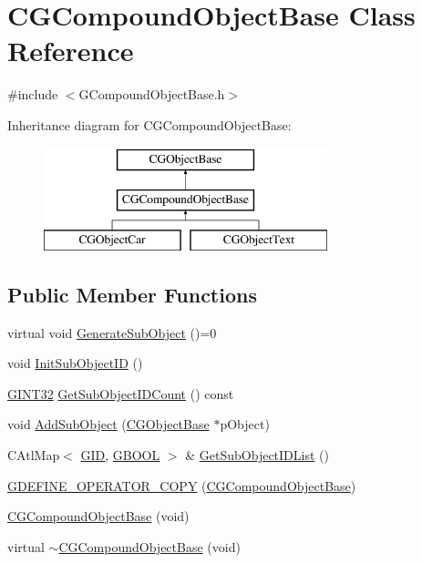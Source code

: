 \hypertarget{class_c_g_compound_object_base}{}\section{C\+G\+Compound\+Object\+Base Class Reference}
\label{class_c_g_compound_object_base}


{\ttfamily \#include $<$G\+Compound\+Object\+Base.\+h$>$}

Inheritance diagram for C\+G\+Compound\+Object\+Base\+:\begin{figure}[H]
\begin{center}
\leavevmode
\includegraphics[height=3.000000cm]{class_c_g_compound_object_base}
\end{center}
\end{figure}
\subsection*{Public Member Functions}
\begin{DoxyCompactItemize}
\item 
virtual void \hyperlink{class_c_g_compound_object_base_a1edbee3ff93a6bd05e1233c58898754e}{Generate\+Sub\+Object} ()=0
\item 
void \hyperlink{class_c_g_compound_object_base_a120a1ad5f33efda9c18bbca418285d24}{Init\+Sub\+Object\+I\+D} ()
\item 
\hyperlink{_g_types_8h_a40d8bc7c06b9e72906852691a4bf888e}{G\+I\+N\+T32} \hyperlink{class_c_g_compound_object_base_a3cebb709c979c48297c1c318968d7bb4}{Get\+Sub\+Object\+I\+D\+Count} () const 
\item 
void \hyperlink{class_c_g_compound_object_base_a72b2ef55ba1b6d2aa85a37c3ef225e4b}{Add\+Sub\+Object} (\hyperlink{class_c_g_object_base}{C\+G\+Object\+Base} $\ast$p\+Object)
\item 
C\+Atl\+Map$<$ \hyperlink{_g_types_8h_a5b96ecb16d8e437977d12cd40aa6f6d8}{G\+I\+D}, \hyperlink{_g_types_8h_a2901915743626352a6820c5405f556dc}{G\+B\+O\+O\+L} $>$ \& \hyperlink{class_c_g_compound_object_base_a375d8ea5ab9f34f62f3093f7e428fd26}{Get\+Sub\+Object\+I\+D\+List} ()
\item 
\hyperlink{class_c_g_compound_object_base_aa0196b7e44772dcde6a58db8268c9317}{G\+D\+E\+F\+I\+N\+E\+\_\+\+O\+P\+E\+R\+A\+T\+O\+R\+\_\+\+C\+O\+P\+Y} (\hyperlink{class_c_g_compound_object_base}{C\+G\+Compound\+Object\+Base})
\item 
\hyperlink{class_c_g_compound_object_base_a7f674fc0fc64f4923ea6781041eb13e0}{C\+G\+Compound\+Object\+Base} (void)
\item 
virtual \hyperlink{class_c_g_compound_object_base_a34c806011a7f58f1330ac8913e158222}{$\sim$\+C\+G\+Compound\+Object\+Base} (void)
\end{DoxyCompactItemize}
